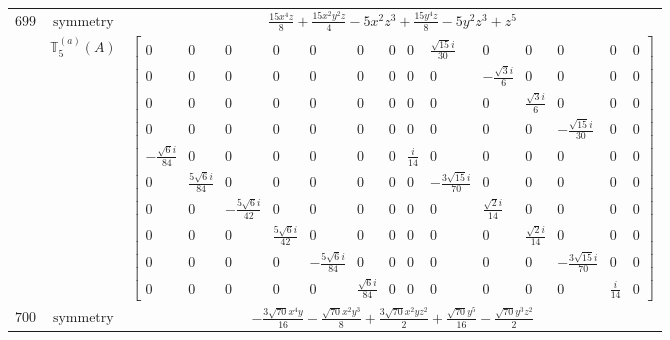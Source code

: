 \documentclass[fleqn,8pt,landscape]{jsarticle}
\begin{document}
\begin{longtable}{ccc}
$ 699 $ & $ \text{symmetry} $ & $ \frac{15 x^{4} z}{8} + \frac{15 x^{2} y^{2} z}{4} - 5 x^{2} z^{3} + \frac{15 y^{4} z}{8} - 5 y^{2} z^{3} + z^{5} $ \\
$  $ & $ \mathbb{T}_{5}^{(a)}(A) $ & $ \begin{bmatrix} 0 & 0 & 0 & 0 & 0 & 0 & 0 & 0 & \frac{\sqrt{15} i}{30} & 0 & 0 & 0 & 0 & 0 \\ 0 & 0 & 0 & 0 & 0 & 0 & 0 & 0 & 0 & - \frac{\sqrt{3} i}{6} & 0 & 0 & 0 & 0 \\ 0 & 0 & 0 & 0 & 0 & 0 & 0 & 0 & 0 & 0 & \frac{\sqrt{3} i}{6} & 0 & 0 & 0 \\ 0 & 0 & 0 & 0 & 0 & 0 & 0 & 0 & 0 & 0 & 0 & - \frac{\sqrt{15} i}{30} & 0 & 0 \\ - \frac{\sqrt{6} i}{84} & 0 & 0 & 0 & 0 & 0 & 0 & \frac{i}{14} & 0 & 0 & 0 & 0 & 0 & 0 \\ 0 & \frac{5 \sqrt{6} i}{84} & 0 & 0 & 0 & 0 & 0 & 0 & - \frac{3 \sqrt{15} i}{70} & 0 & 0 & 0 & 0 & 0 \\ 0 & 0 & - \frac{5 \sqrt{6} i}{42} & 0 & 0 & 0 & 0 & 0 & 0 & \frac{\sqrt{2} i}{14} & 0 & 0 & 0 & 0 \\ 0 & 0 & 0 & \frac{5 \sqrt{6} i}{42} & 0 & 0 & 0 & 0 & 0 & 0 & \frac{\sqrt{2} i}{14} & 0 & 0 & 0 \\ 0 & 0 & 0 & 0 & - \frac{5 \sqrt{6} i}{84} & 0 & 0 & 0 & 0 & 0 & 0 & - \frac{3 \sqrt{15} i}{70} & 0 & 0 \\ 0 & 0 & 0 & 0 & 0 & \frac{\sqrt{6} i}{84} & 0 & 0 & 0 & 0 & 0 & 0 & \frac{i}{14} & 0 \end{bmatrix} $ \\ \hline
$ 700 $ & $ \text{symmetry} $ & $ - \frac{3 \sqrt{70} x^{4} y}{16} - \frac{\sqrt{70} x^{2} y^{3}}{8} + \frac{3 \sqrt{70} x^{2} y z^{2}}{2} + \frac{\sqrt{70} y^{5}}{16} - \frac{\sqrt{70} y^{3} z^{2}}{2} $ \\

\end{longtable}
\end{document}
